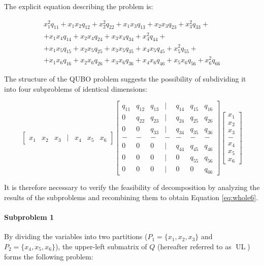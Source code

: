 The explicit equation describing the problem is:

\begin{multline}
    x_1^2q_{11} + x_1x_2q_{12} + x_2^2q_{22} + x_1x_3q_{13} + x_2x_3q_{23} + x_3^2q_{33} + \\ 
    + x_1x_4q_{14} + x_2x_4q_{24} + x_3x_4q_{34} + x_4^2q_{44} + \\ 
    + x_1x_5q_{15} + x_2x_5q_{25} + x_3x_5q_{35} + x_4x_5q_{45} + x_5^2q_{55} + \\ 
    + x_1x_6q_{16} + x_2x_6q_{26} + x_3x_6q_{36} + x_4x_6q_{46} + x_5x_6q_{56} + x_6^2q_{66}
    \label{eq:whole6}
\end{multline}

The structure of the QUBO problem suggests the possibility of subdividing it into four subproblems of identical dimensions:

\begin{equation}
    \begin{bmatrix}
        x_1 & x_2 & x_3 & | & x_4 & x_5 & x_6
    \end{bmatrix}
    \begin{bmatrix}
        q_{11} & q_{12} & q_{13} & | & q_{14} & q_{15} & q_{16} \\
        0 & q_{22} & q_{23} & | & q_{24} & q_{25} & q_{26} \\
        0 & 0 & q_{33} & | & q_{34} & q_{35} & q_{36} \\
        - & - & - & - & - & -  & - \\
        0 & 0 & 0 & | & q_{44} & q_{45} & q_{46} \\
        0 & 0 & 0 & | & 0 & q_{55} & q_{56} \\
        0 & 0 & 0 & | & 0 & 0 & q_{66}
    \end{bmatrix}
    \begin{bmatrix}
        x_1 \\
        x_2 \\
        x_3 \\
        - \\
        x_4 \\
        x_5 \\
        x_6
    \end{bmatrix}
\end{equation}

It is therefore necessary to verify the feasibility of decomposition by analyzing the results of the subproblems and recombining them to obtain Equation \eqref{eq:whole6}.

\paragraph{Subproblem 1}
By dividing the variables into two partitions ($P_1=\{x_1,x_2,x_3\}$ and $P_2=\{x_4,x_5,x_6\}$), the upper-left submatrix of $Q$ (hereafter referred to as $\operatorname{UL}$) forms the following problem:

